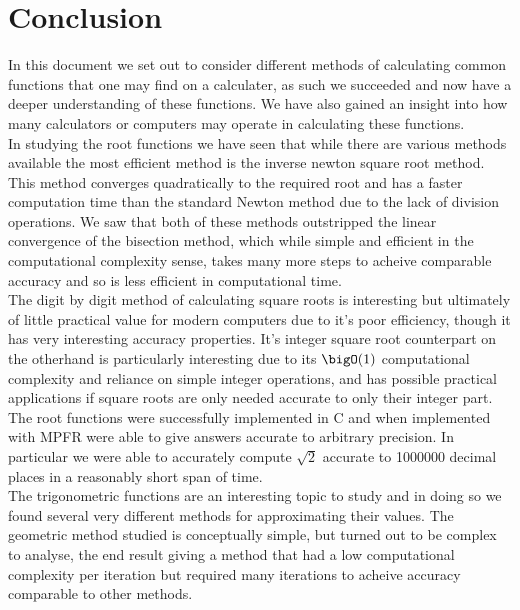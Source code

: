 \section{Conclusion}

In this document we set out to consider different methods of calculating common functions that one may find on a calculater, as such we succeeded and now have a deeper understanding of these functions. We have also gained an insight into how many calculators or computers may operate in calculating these functions.\\

In studying the root functions we have seen that while there are various methods available the most efficient method is the inverse newton square root method. This method converges quadratically to the required root and has a faster computation time than the standard Newton method due to the lack of division operations. We saw that both of these methods outstripped the linear convergence of the bisection method, which while simple and efficient in the computational complexity sense, takes many more steps to acheive comparable accuracy and so is less efficient in computational time.\\

The digit by digit method of calculating square roots is interesting but ultimately of little practical value for modern computers due to it's poor efficiency, though it has very interesting accuracy properties. It's integer square root counterpart on the otherhand is particularly interesting due to its \(\bigO(1)\) computational complexity and reliance on simple integer operations, and has possible practical applications if square roots are only needed accurate to only their integer part.\\

The root functions were successfully implemented in C and when implemented with MPFR were able to give answers accurate to arbitrary precision. In particular we were able to accurately compute \(\sqrt{2}\) accurate to 1000000 decimal places in a reasonably short span of time.\\

The trigonometric functions are an interesting topic to study and in doing so we found several very different methods for approximating their values. The geometric method studied is conceptually simple, but turned out to be complex to analyse, the end result giving a method that had a low computational complexity per iteration but required many iterations to acheive accuracy comparable to other methods.\\

